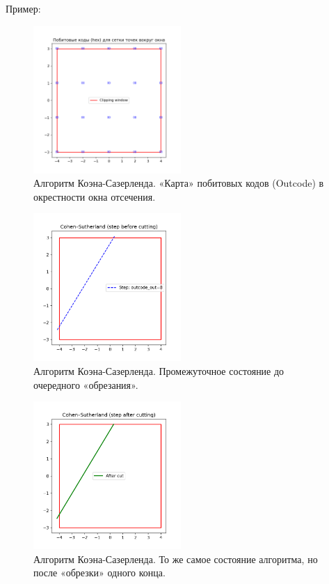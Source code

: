 \documentclass[areasetadvanced]{scrartcl}
\begin{document}
Пример:
\begin{figure}[H]
    \centering
    \includegraphics[width=0.5\textwidth]{../images/cohen_outcode_map.png}
    \caption{Алгоритм Коэна-Сазерленда. «Карта» побитовых кодов (Outcode) в окрестности окна отсечения.}
    \label{fig:cohen_outcode}
\end{figure}

\begin{figure}[H]
    \centering
    \includegraphics[width=0.5\textwidth]{../images/cohen_step_1_before.png}
    \caption{Алгоритм Коэна-Сазерленда. Промежуточное состояние до очередного «обрезания».}
    \label{fig:cohen_step1}
\end{figure}

\begin{figure}[H]
    \centering
    \includegraphics[width=0.5\textwidth]{../images/cohen_step_2_after.png}
    \caption{Алгоритм Коэна-Сазерленда. То же самое состояние алгоритма, но после «обрезки» одного конца.}
    \label{fig:cohen_step2}
\end{figure}
\end{document}
